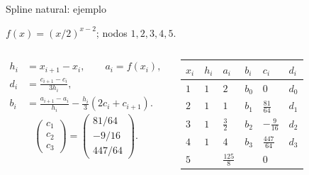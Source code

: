 \documentclass[original_version/main.tex]{subfiles}
\begin{document}
\begin{frame}[t]{Spline natural: ejemplo}
\par\noindent\begin{minipage}[t][9mm][t]{\textwidth}\small\strut $f(x)=(x/2)^{x-2}$; nodos $1,2,3,4,5$.\end{minipage}\par\nointerlineskip
\begin{columns}[T]\scriptsize\begin{align*}
h_i&=x_{i+1}-x_i,\qquad a_i=f(x_i),\\
d_i&=\frac{c_{i+1}-c_i}{3h_i},\\
b_i&=\frac{a_{i+1}-a_i}{h_i}-\frac{h_i}{3}(2c_i+c_{i+1}).
\end{align*}\scriptsize\[\begin{pmatrix}c_1\\c_2\\c_3\end{pmatrix}=\begin{pmatrix}81/64\\-9/16\\447/64\end{pmatrix}.\]\begin{minipage}[t]{\textwidth}\begingroup\scriptsize\setlength{\tabcolsep}{2pt}\begin{center}\begin{tabular}{|C{.12\textwidth}|C{.12\textwidth}|C{.12\textwidth}|C{.12\textwidth}|C{.12\textwidth}|C{.12\textwidth}|}\hline
\rule[-2mm]{0pt}{6mm}$x_i$&$h_i$&$a_i$&$b_i$&$c_i$&$d_i$\\\hline
\rule[-2.5mm]{0pt}{7mm}$1$&$1$&$2$&$b_0$&$0$&$d_0$\\\hline
\rule[-2.5mm]{0pt}{7mm}$2$&$1$&$1$&$b_1$&$\frac{81}{64}$&$d_1$\\\hline
\rule[-2.5mm]{0pt}{7mm}$3$&$1$&$\frac{3}{2}$&$b_2$&$-\frac{9}{16}$&$d_2$\\\hline
\rule[-2.5mm]{0pt}{7mm}$4$&$1$&$4$&$b_3$&$\frac{447}{64}$&$d_3$\\\hline
\rule[-2.5mm]{0pt}{7mm}$5$&&$\frac{125}{8}$&&$0$&\\\hline
\end{tabular}\end{center}\endgroup\end{minipage}\par
\end{columns}
\end{frame}
\end{document}
